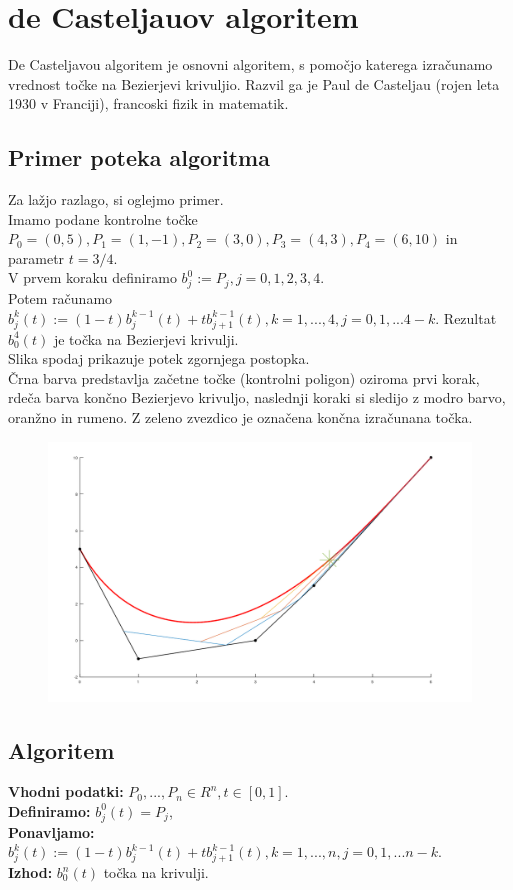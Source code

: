 \documentclass{article}
\begin{document}
\section{de Casteljauov algoritem}
De Casteljavou algoritem je osnovni algoritem, s pomočjo katerega izračunamo vrednost točke na Bezierjevi krivuljio.
Razvil ga je Paul de Casteljau (rojen leta 1930 v Franciji), francoski fizik in matematik.

\subsection{Primer poteka algoritma}
Za lažjo razlago, si oglejmo primer. \\
Imamo podane kontrolne točke $P_0=(0,5),P_1=(1,-1),P_2=(3,0),P_3=(4,3),P_4=(6,10)$ in parametr $t=3/4$. \\
V prvem koraku definiramo $b_{j}^{0} := P_{j},j=0,1,2,3,4$. \\
Potem računamo $b_{j}^k(t) :=(1-t)b_{j}^{k-1}(t) + tb_{j+1}^{k-1}(t), k = 1,...,4, j = 0,1,...4-k$.
Rezultat $b_{0}^4(t)$ je točka na Bezierjevi krivulji.\\
Slika spodaj prikazuje potek zgornjega postopka. \\
Črna barva predstavlja začetne točke (kontrolni poligon) oziroma prvi korak, rdeča barva končno Bezierjevo krivuljo, naslednji koraki si sledijo z modro barvo, oranžno in rumeno. Z zeleno zvezdico je označena končna izračunana točka.

 \begin{figure}[!ht]
\centering
       \includegraphics[width=120mm]{koncna.png}
\end{figure}




\subsection{Algoritem}
\textbf{Vhodni podatki:} $P_0,...,P_n\in R^n, t\in [0,1]$. \\
\textbf{Definiramo:} $b_j^0(t) = P_j$,\\
\textbf{Ponavljamo:}  $b_{j}^k(t) :=(1-t)b_{j}^{k-1}(t) + tb_{j+1}^{k-1}(t), k = 1,...,n, j = 0,1,...n-k$.\\
\textbf{Izhod:} $b_0^n(t)$ točka na krivulji.\\
\end{document}
